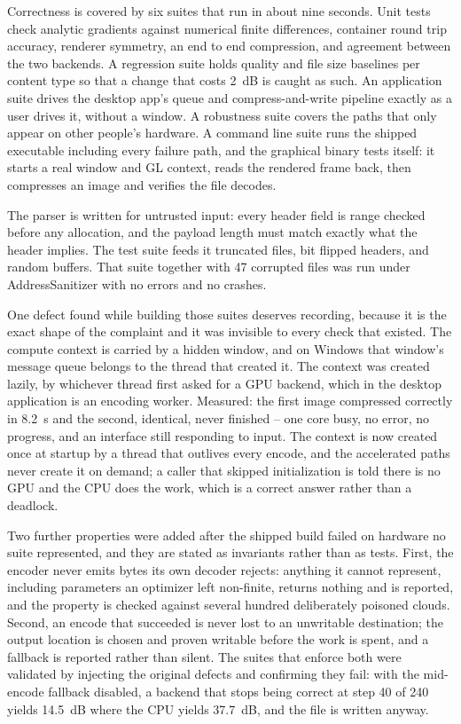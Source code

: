 \documentclass[11pt,a4paper]{article}
\begin{document}
Correctness is covered by six suites that run in about nine seconds. Unit tests check analytic gradients against numerical finite differences, container round trip accuracy, renderer symmetry, an end to end compression, and agreement between the two backends. A regression suite holds quality and file size baselines per content type so that a change that costs 2~dB is caught as such. An application suite drives the desktop app's queue and compress-and-write pipeline exactly as a user drives it, without a window. A robustness suite covers the paths that only appear on other people's hardware. A command line suite runs the shipped executable including every failure path, and the graphical binary tests itself: it starts a real window and GL context, reads the rendered frame back, then compresses an image and verifies the file decodes.

The parser is written for untrusted input: every header field is range checked before any allocation, and the payload length must match exactly what the header implies. The test suite feeds it truncated files, bit flipped headers, and random buffers. That suite together with 47 corrupted files was run under AddressSanitizer with no errors and no crashes.

One defect found while building those suites deserves recording, because it is the exact shape of the complaint and it was invisible to every check that existed. The compute context is carried by a hidden window, and on Windows that window's message queue belongs to the thread that created it. The context was created lazily, by whichever thread first asked for a GPU backend, which in the desktop application is an encoding worker. Measured: the first image compressed correctly in 8.2~s and the second, identical, never finished -- one core busy, no error, no progress, and an interface still responding to input. The context is now created once at startup by a thread that outlives every encode, and the accelerated paths never create it on demand; a caller that skipped initialization is told there is no GPU and the CPU does the work, which is a correct answer rather than a deadlock.

Two further properties were added after the shipped build failed on hardware no suite represented, and they are stated as invariants rather than as tests. First, the encoder never emits bytes its own decoder rejects: anything it cannot represent, including parameters an optimizer left non-finite, returns nothing and is reported, and the property is checked against several hundred deliberately poisoned clouds. Second, an encode that succeeded is never lost to an unwritable destination; the output location is chosen and proven writable before the work is spent, and a fallback is reported rather than silent. The suites that enforce both were validated by injecting the original defects and confirming they fail: with the mid-encode fallback disabled, a backend that stops being correct at step 40 of 240 yields 14.5~dB where the CPU yields 37.7~dB, and the file is written anyway.
\end{document}
